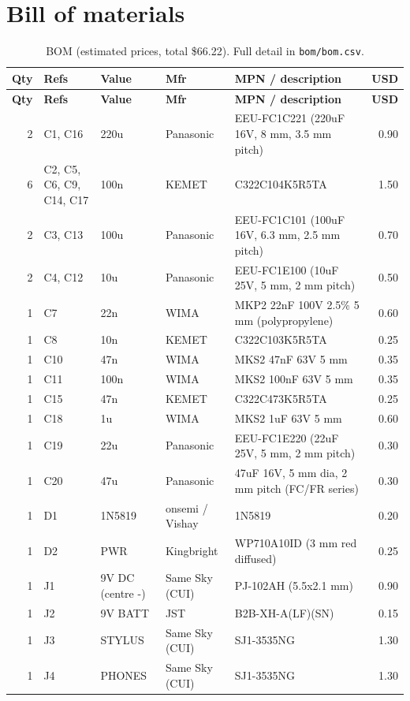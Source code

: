 \documentclass[10pt,a4paper]{article}
\begin{document}
\appendix\section{Bill of materials}{\scriptsize\begin{longtable}{rp{3.6cm}lp{2.2cm}p{4.6cm}r}\caption{BOM (estimated prices, total \$66.22). Full detail in \texttt{bom/bom.csv}.}\\\toprule
\textbf{Qty} & \textbf{Refs} & \textbf{Value} & \textbf{Mfr} & \textbf{MPN / description} & \textbf{USD} \\ \midrule\endfirsthead
\toprule \textbf{Qty} & \textbf{Refs} & \textbf{Value} & \textbf{Mfr} & \textbf{MPN / description} & \textbf{USD} \\ \midrule\endhead
2 & C1, C16 & 220u & Panasonic & EEU-FC1C221 (220uF 16V, 8 mm, 3.5 mm pitch) & 0.90 \\
6 & C2, C5, C6, C9, C14, C17 & 100n & KEMET & C322C104K5R5TA & 1.50 \\
2 & C3, C13 & 100u & Panasonic & EEU-FC1C101 (100uF 16V, 6.3 mm, 2.5 mm pitch) & 0.70 \\
2 & C4, C12 & 10u & Panasonic & EEU-FC1E100 (10uF 25V, 5 mm, 2 mm pitch) & 0.50 \\
1 & C7 & 22n & WIMA & MKP2 22nF 100V 2.5\% 5 mm (polypropylene) & 0.60 \\
1 & C8 & 10n & KEMET & C322C103K5R5TA & 0.25 \\
1 & C10 & 47n & WIMA & MKS2 47nF 63V 5 mm & 0.35 \\
1 & C11 & 100n & WIMA & MKS2 100nF 63V 5 mm & 0.35 \\
1 & C15 & 47n & KEMET & C322C473K5R5TA & 0.25 \\
1 & C18 & 1u & WIMA & MKS2 1uF 63V 5 mm & 0.60 \\
1 & C19 & 22u & Panasonic & EEU-FC1E220 (22uF 25V, 5 mm, 2 mm pitch) & 0.30 \\
1 & C20 & 47u & Panasonic & 47uF 16V, 5 mm dia, 2 mm pitch (FC/FR series) & 0.30 \\
1 & D1 & 1N5819 & onsemi / Vishay & 1N5819 & 0.20 \\
1 & D2 & PWR & Kingbright & WP710A10ID (3 mm red diffused) & 0.25 \\
1 & J1 & 9V DC (centre -) & Same Sky (CUI) & PJ-102AH (5.5x2.1 mm) & 0.90 \\
1 & J2 & 9V BATT & JST & B2B-XH-A(LF)(SN) & 0.15 \\
1 & J3 & STYLUS & Same Sky (CUI) & SJ1-3535NG & 1.30 \\
1 & J4 & PHONES & Same Sky (CUI) & SJ1-3535NG & 1.30 \\

\end{longtable}}
\end{document}
